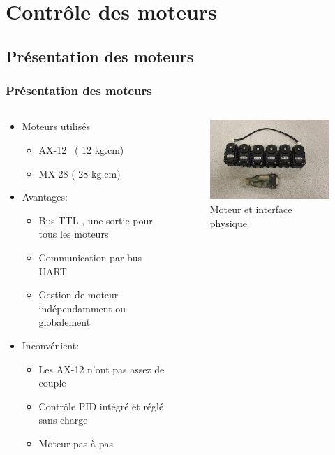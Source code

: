 \section{Contrôle des moteurs}
\subsection{Présentation des moteurs}
\begin{frame}
  \frametitle{Présentation des moteurs}
  \begin{columns}[c]
    \begin{column}{.65\textwidth}
           \begin{itemize}
            \item Moteurs utilisés 
            \begin{itemize}
              \item AX-12~ ( 12 kg.cm)
              \item MX-28 ( 28 kg.cm)
            \end{itemize}
            \item Avantages:
            \begin{itemize}
              \item Bus TTL , une sortie pour tous les moteurs
              \item Communication par bus UART
              \item Gestion de moteur indépendamment ou globalement
            \end{itemize}
          \item Inconvénient:
            \begin{itemize}
              \item Les AX-12 n'ont pas assez de couple
              \item Contrôle PID intégré et réglé sans charge
              \item Moteur pas à pas
            \end{itemize}
          \end{itemize}
        \end{column}
        \begin{column}{.3\textwidth}
          \begin{figure}[ht]
            \centering
            \includegraphics[scale= 0.35]{../img/AX12+USB_2_DynamicCell.JPG}
            \caption{Moteur et interface physique}
          \end{figure}
        \end{column}
      \end{columns}

\end{frame}
